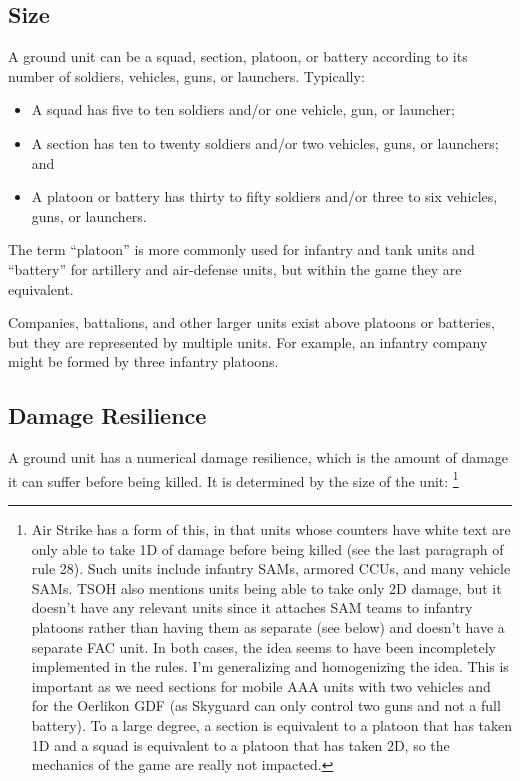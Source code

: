 \documentclass[10pt]{article}
\newcommand{\note}[1]{%
    \footnote{%
        \setlength{\parindent}{0pt}%
        \setlength{\parskip}{\smallskipamount}%
        #1
    }%
}
\begin{document}
\subsection{Size}

A ground unit can be a squad, section, platoon, or battery according to its number of soldiers, vehicles, guns, or launchers. Typically:

\begin{itemize}
    \item A squad has five to ten soldiers and/or one vehicle, gun, or launcher;
    \item A section has ten to twenty soldiers and/or two vehicles, guns, or launchers; and
    \item A platoon or battery has thirty to fifty soldiers and/or three to six vehicles, guns, or launchers.
\end{itemize}

The term “platoon” is more commonly used for infantry and tank units and “battery” for artillery and air-defense units, but within the game they are equivalent.

Companies, battalions, and other larger units exist above platoons or batteries, but they are represented by multiple units. For example, an infantry company might be formed by three infantry platoons.

\subsection{Damage Resilience}

A ground unit has a numerical damage resilience, which is the amount of damage it can suffer before being killed. It is determined by the size of the unit:%
\note{
    Air Strike has a form of this, in that units whose counters have white text are only able to take 1D of damage before being killed (see the last paragraph of rule 28). Such units include infantry SAMs, armored CCUs, and many vehicle SAMs. TSOH also mentions units being able to take only 2D damage, but it doesn't have any relevant units since it attaches SAM teams to infantry platoons rather than having them as separate (see below) and doesn't have a separate FAC unit. In both cases, the idea seems to have been incompletely implemented in the rules. I'm generalizing and homogenizing the idea. This is important as we need sections for mobile AAA units with two vehicles and for the Oerlikon GDF (as Skyguard can only control two guns and not a full battery). To a large degree, a section is equivalent to a platoon that has taken 1D and a squad is equivalent to a platoon that has taken 2D, so the mechanics of the game are really not impacted.
}
\end{document}
